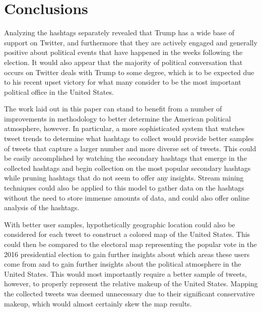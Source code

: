 \documentclass[prodmode]{acmsmall} %
\begin{document}


\section{Conclusions}
Analyzing the hashtags separately revealed that Trump has a wide base of support
on Twitter, and furthermore that they are actively engaged and generally
positive about political events that have happened in the weeks following the
election. It would also appear that the majority of political conversation that
occurs on Twitter deals with Trump to some degree, which is to be expected due
to his recent upset victory for what many consider to be the most important
political office in the United States.

The work laid out in this paper can stand to benefit from a number of
improvements in methodology to better determine the American political
atmosphere, however. In particular, a more sophisticated system that watches
tweet trends to determine what hashtags to collect would provide better samples
of tweets that capture a larger number and more diverse set of tweets. This
could be easily accomplished by watching the secondary hashtags that emerge in
the collected hashtags and begin collection on the most popular secondary
hashtags while pruning hashtags that do not seem to offer any insights. Stream
mining techniques could also be applied to this model to gather data on the
hashtags without the need to store immense amounts of data, and could also offer
online analysis of the hashtags. 

With better user samples, hypothetically geographic location could also be
considered for each tweet to construct a colored map of the United States. This
could then be compared to the electoral map representing the popular vote in the
2016 presidential election to gain further insights about which areas these
users come from and to gain further insights about the political atmosphere in
the United States. This would most importantly require a better sample of
tweets, however, to properly represent the relative makeup of the United States.
Mapping the collected tweets was deemed unnecessary due to their significant
conservative makeup, which would almost certainly skew the map results.
\end{document}
